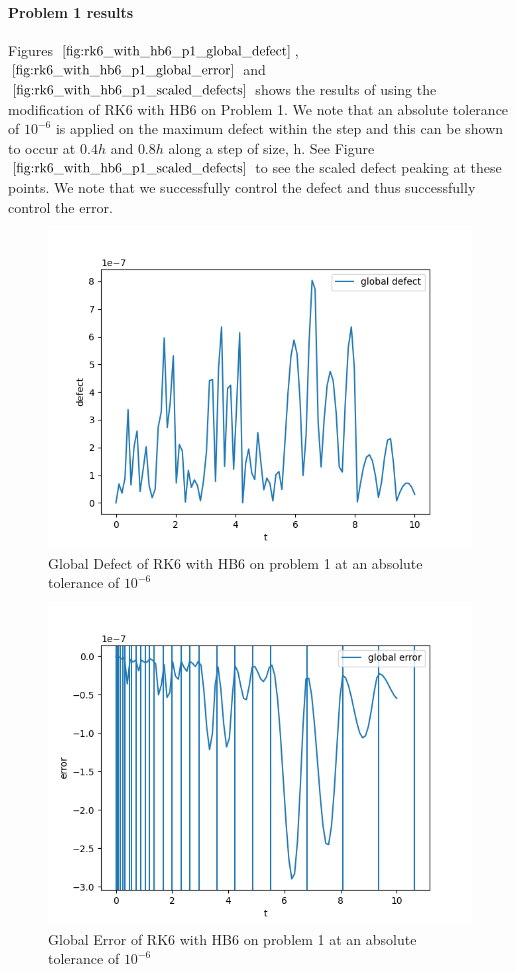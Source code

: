 \documentclass{article}
\begin{document}
\paragraph{Problem 1 results}
Figures $\ref{fig:rk6_with_hb6_p1_global_defect}$, $\ref{fig:rk6_with_hb6_p1_global_error}$ and $\ref{fig:rk6_with_hb6_p1_scaled_defects}$ shows the results of using the modification of RK6 with HB6 on Problem 1. We note that an absolute tolerance of $10^{-6}$ is applied on the maximum defect within the step and this can be shown to occur at $0.4h$ and $0.8h$ along a step of size, h. See Figure $\ref{fig:rk6_with_hb6_p1_scaled_defects}$ to see the scaled defect peaking at these points. We note that we successfully control the defect and thus successfully control the error.

\begin{figure}[H]
\centering
\includegraphics[width=0.7\linewidth]{./figures/rk6_with_hb6_p1_global_defect}
\caption{Global Defect of RK6 with HB6 on problem 1 at an absolute tolerance of $10^{-6}$}
\label{fig:rk6_with_hb6_p1_global_defect}
\end{figure}

\begin{figure}[H]
\centering
\includegraphics[width=0.7\linewidth]{./figures/rk6_with_hb6_p1_global_error}
\caption{Global Error of RK6 with HB6 on problem 1 at an absolute tolerance of $10^{-6}$}
\label{fig:rk6_with_hb6_p1_global_error}
\end{figure}
\end{document}
